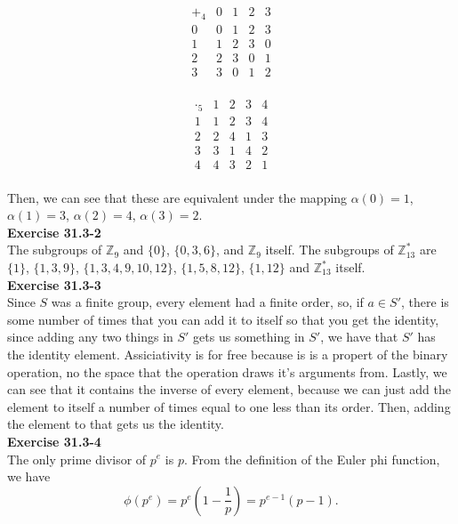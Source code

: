 \documentclass{article}
\begin{document}
\[
\begin{array}{c|cccc}
+_4&0&1&2&3\\
\hline
0&0&1&2&3\\
1&1&2&3&0\\
2&2&3&0&1\\
3&3&0&1&2\\
\end{array}
\]

\[
\begin{array}{c|cccc}
\cdot_5&1&2&3&4\\
\hline
1&1&2&3&4\\
2&2&4&1&3\\
3&3&1&4&2\\
4&4&3&2&1\\
\end{array}
\]

Then, we can see that these are equivalent under the mapping $\alpha(0) =1$, $\alpha(1)= 3$, $\alpha(2) = 4$, $\alpha(3) =2$.\\

\noindent\textbf{Exercise 31.3-2}\\

The subgroups of $\mathbb{Z}_9$ and $\{0\}$, $\{0,3,6\}$, and $\mathbb{Z}_9$ itself.  The subgroups of $\mathbb{Z}_{13}^*$ are $\{ 1\}$, $\{1,3,9\}$, $\{1,3,4,9,10,12\}$, $\{1,5,8,12\}$, $\{1,12\}$ and $\mathbb{Z}_{13}^*$ itself. \\

\noindent\textbf{Exercise 31.3-3}\\

Since $S$ was a finite group, every element had a finite order, so, if $a\in S'$, there is some number of times that you can add it to itself so that you get the identity, since adding any two things in $S'$ gets us something in $S'$, we have that $S'$ has the identity element. Assiciativity is for free because is is a propert of the binary operation, no the space that the operation draws it's arguments from. Lastly, we can see that it contains the inverse of every element, because we can just add the element to itself a number of times equal to one less than its order. Then, adding the element to that gets us the identity.\\

\noindent\textbf{Exercise 31.3-4}\\

The only prime divisor of $p^e$ is $p$.  From the definition of the Euler phi function, we have
\[ \phi(p^e) = p^e\left(1-\frac{1}{p}\right) = p^{e-1}(p-1).\]
\end{document}

